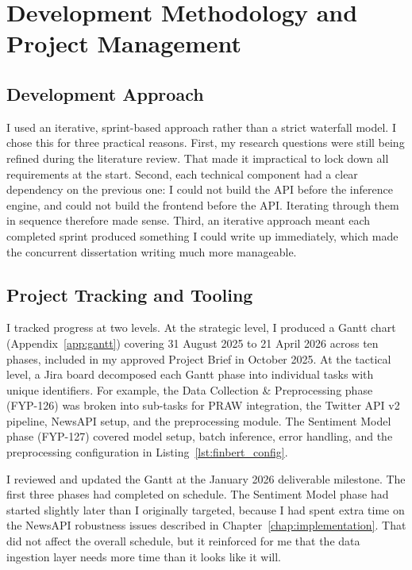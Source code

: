 \section{Development Methodology and Project Management}
\label{sec:dev_methodology}

\subsection{Development Approach}

I used an iterative, sprint-based approach rather than a strict waterfall model. I chose this for three practical reasons. First, my research questions were still being refined during the literature review. That made it impractical to lock down all requirements at the start. Second, each technical component had a clear dependency on the previous one: I could not build the API before the inference engine, and could not build the frontend before the API. Iterating through them in sequence therefore made sense. Third, an iterative approach meant each completed sprint produced something I could write up immediately, which made the concurrent dissertation writing much more manageable.

\subsection{Project Tracking and Tooling}

I tracked progress at two levels. At the strategic level, I produced a Gantt chart (Appendix~\ref{app:gantt}) covering 31 August 2025 to 21 April 2026 across ten phases, included in my approved Project Brief in October 2025. At the tactical level, a Jira board decomposed each Gantt phase into individual tasks with unique identifiers. For example, the Data Collection \& Preprocessing phase (FYP-126) was broken into sub-tasks for PRAW integration, the Twitter API v2 pipeline, NewsAPI setup, and the preprocessing module. The Sentiment Model phase (FYP-127) covered model setup, batch inference, error handling, and the preprocessing configuration in Listing~\ref{lst:finbert_config}.

I reviewed and updated the Gantt at the January 2026 deliverable milestone. The first three phases had completed on schedule. The Sentiment Model phase had started slightly later than I originally targeted, because I had spent extra time on the NewsAPI robustness issues described in Chapter~\ref{chap:implementation}. That did not affect the overall schedule, but it reinforced for me that the data ingestion layer needs more time than it looks like it will.

